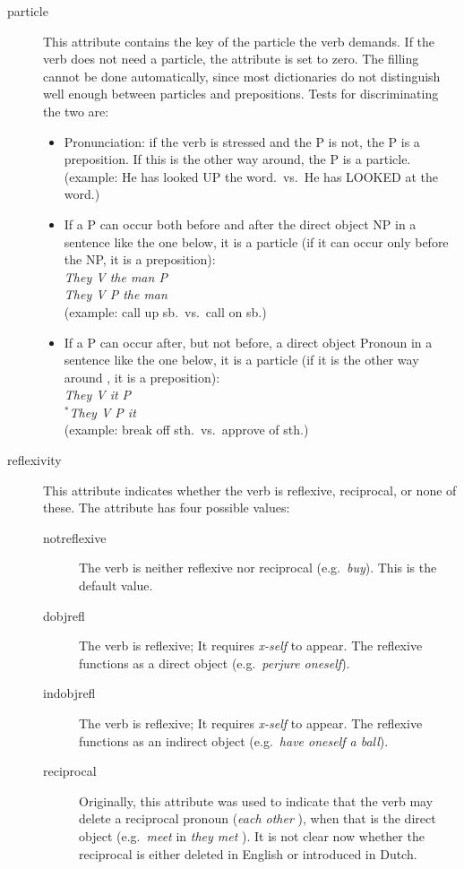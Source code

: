 \begin{description}
\item[particle] This attribute contains the key of the particle the verb
demands. If the verb does not need a particle, the attribute is set to zero. 
The filling 
cannot be done automatically, since most dictionaries do not distinguish well 
enough between particles and prepositions. Tests for discriminating the two are:
  \begin{itemize}
  \item Pronunciation: if the verb is stressed and the P is not, the P is a 
preposition. If this is the other way around, the P is a particle. (example: He 
has looked UP the word.\ vs.\ He has LOOKED at the word.)
  \item If a P can occur both before and after the direct object NP in a 
   sentence like the one below, it is a particle (if it can occur only before 
   the NP, it is a preposition):\\
  {\em They V the man P\/}\\
  {\em They V P the man\/}\\
  (example: call up sb.\ vs.\ call on sb.)
  \item If a P can occur after, but not before, a direct object Pronoun in a
   sentence like the one below, it is a particle (if it is the other way around
   , it is a preposition):\\
  {\em They V it P\/}\\
  {\em $^{*}$They V P it\/}\\
  (example: break off sth.\ vs.\ approve of sth.)
  \end{itemize}

\item[reflexivity] This attribute indicates whether the verb is reflexive,
reciprocal, or none of these.   The attribute has four possible values: 
   \begin{description}
   \item[notreflexive] The verb is neither reflexive nor reciprocal (e.g.\
     {\em  buy}). This is the default value.
   \item[dobjrefl] The verb is reflexive; It requires {\em x-self\/} to appear. 
   The reflexive functions as a direct object (e.g.\ {\em perjure oneself\/}).
   \item[indobjrefl] The verb is reflexive; It requires {\em x-self\/} to 
   appear. The reflexive functions as an indirect object (e.g.\ {\em have 
   oneself a ball\/}).
   \item[reciprocal] Originally, this attribute was used to indicate that 
the verb may delete a reciprocal pronoun ({\em each other
   \/}), when that is the direct object (e.g.\ {\em  meet\/} in {\em they met
   \/}). It is not clear now whether the reciprocal is either deleted in 
English or introduced in Dutch. 
   \end{description}


\end{description}
